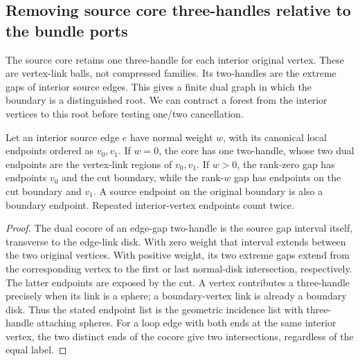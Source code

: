 \subsection{Removing source core three-handles relative to the bundle ports}
\label{marked-cut:three-handles}

The source core retains one three-handle for each interior original vertex.
These are vertex-link balls, not compressed families. Its two-handles are
the extreme gaps of interior source edges. This gives a finite dual graph
in which the boundary is a distinguished root. We can contract a forest
from the interior vertices to this root before testing one/two cancellation.

\begin{proposition}
\label{marked-cut:dual-endpoints}
Let an interior source edge $e$ have normal weight $w$, with its canonical
local endpoints ordered as $v_0,v_1$. If $w=0$, the core has one two-handle,
whose two dual endpoints are the vertex-link regions of $v_0,v_1$. If
$w>0$, the rank-zero gap has endpoints $v_0$ and the cut boundary, while
the rank-$w$ gap has endpoints on the cut boundary and $v_1$.
A source endpoint on the original boundary is also a boundary endpoint.
Repeated interior-vertex endpoints count twice.
\end{proposition}
\begin{proof}
The dual cocore of an edge-gap two-handle is the source gap interval itself,
transverse to the edge-link disk. With zero weight that interval extends
between the two original vertices. With positive weight, its two extreme
gaps extend from the corresponding vertex to the first or last normal-disk
intersection, respectively. The latter endpoints are exposed by the cut.
A vertex contributes a three-handle precisely when its link is a sphere;
a boundary-vertex link is already a boundary disk. Thus the stated endpoint
list is the geometric incidence list with three-handle attaching spheres.
For a loop edge with both ends at the same interior vertex, the two distinct
ends of the cocore give two intersections, regardless of the equal label.
\end{proof}

